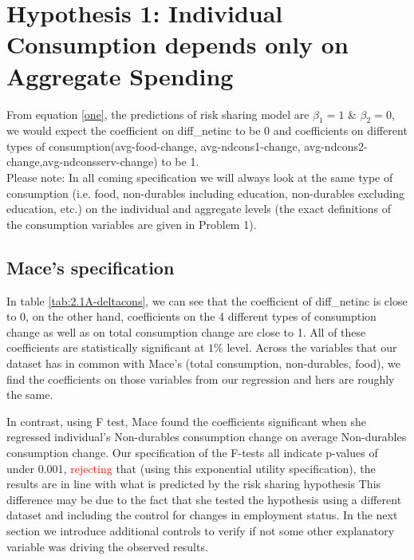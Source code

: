 \documentclass[12pt,a4paper]{article}
\begin{document}
\section*{Hypothesis 1: Individual Consumption depends only on Aggregate Spending}
From equation \eqref{one}, the predictions of risk sharing model are $\beta_1=1$ \& $\beta_2=0$, we would expect the coefficient on diff\_netinc to be 0 and coefficients on different types of consumption(avg-food-change, avg-ndcons1-change,  avg-ndcons2-change,avg-ndconsserv-change) to be 1. \\

Please note: In all coming specification we will always look at the same type of consumption (i.e. food, non-durables including education, non-durables excluding education, etc.) on the individual and aggregate levels (the exact definitions of the consumption variables are given in  Problem 1). 

\subsection*{Mace's specification}



In table \ref{tab:2.1A-deltacons}, we can see that the coefficient of diff\_netinc is close to 0, on the other hand, coefficients on the 4 different types of consumption change as well as on total consumption change are close to 1. All of these coefficients are statistically significant at $1\%$ level. Across the variables that our dataset has in common with Mace's (total consumption, non-durables, food), we find the coefficients on those variables from our regression and hers are roughly the same. 

In contrast, using F test, Mace found the coefficients significant when she regressed individual's Non-durables consumption change on average Non-durables consumption change. Our specification of the F-tests all indicate p-values of under 0.001, \textcolor{red}{rejecting} that (using this exponential utility specification), the results are in line with what is predicted by the risk sharing hypothesis This difference may be due to the fact that she tested the hypothesis using a different dataset and including the control for changes in employment status. In the next section we introduce additional controls to verify if not some other explanatory variable was driving the observed results.
\end{document}
